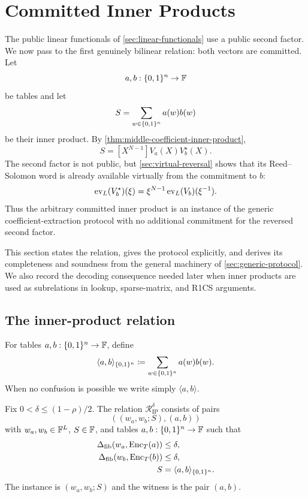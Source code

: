 \section{Committed Inner Products}
\label{sec:inner-product}

The public linear functionals of \cref{sec:linear-functionals} use a public second factor.  We now pass to the first genuinely bilinear relation: both vectors are committed.  Let
\[
  a,b:\{0,1\}^n\to\mathbb{F}
\]
be tables and let
\[
  S=\sum_{w\in\{0,1\}^n}a(w)b(w)
\]
be their inner product.  By \cref{thm:middle-coefficient-inner-product},
\begin{equation}
  S=[X^{N-1}]V_a(X)V_b^{\star}(X).
  \label{eq:ip-middle-coefficient}
\end{equation}
The second factor is not public, but \cref{sec:virtual-reversal} shows that its Reed--Solomon word is already available virtually from the commitment to $b$:
\begin{equation}
  \operatorname{ev}_L(V_b^{\star})(\xi)
  =\xi^{N-1}\operatorname{ev}_L(V_b)(\xi^{-1}).
  \label{eq:ip-reversal-value}
\end{equation}
Thus the arbitrary committed inner product is an instance of the generic coefficient-extraction protocol with no additional commitment for the reversed second factor.

This section states the relation, gives the protocol explicitly, and derives its completeness and soundness from the general machinery of \cref{sec:generic-protocol}.  We also record the decoding consequence needed later when inner products are used as subrelations in lookup, sparse-matrix, and R1CS arguments.

\subsection{The inner-product relation}
\label{sec:ip-relation}

\begin{definition}
\label{def:hypercube-inner-product}
For tables $a,b:\{0,1\}^n\to\mathbb{F}$, define
\begin{equation}
  \langle a,b\rangle_{\{0,1\}^n}
  \coloneqq
  \sum_{w\in\{0,1\}^n}a(w)b(w).
  \label{eq:hypercube-inner-product}
\end{equation}
When no confusion is possible we write simply $\langle a,b\rangle$.
\end{definition}

\begin{definition}
\label{def:ip-relation}
Fix $0<\delta\le(1-\rho)/2$.  The relation $\mathcal R^{\delta}_{\mathrm{IP}}$ consists of pairs
\[
  ((w_a,w_b;S),(a,b))
\]
with $w_a,w_b\in\mathbb{F}^L$, $S\in\mathbb{F}$, and tables $a,b:\{0,1\}^n\to\mathbb{F}$ such that
\begin{align}
  \Delta_{\mathrm{fib}}(w_a,\operatorname{Enc}_T(a))&\le\delta,
  \label{eq:ip-relation-distance-a}\\
  \Delta_{\mathrm{fib}}(w_b,\operatorname{Enc}_T(b))&\le\delta,
  \label{eq:ip-relation-distance-b}\\
  S&=\langle a,b\rangle_{\{0,1\}^n}.
  \label{eq:ip-relation-value}
\end{align}
The instance is $(w_a,w_b;S)$ and the witness is the pair $(a,b)$.
\end{definition}

